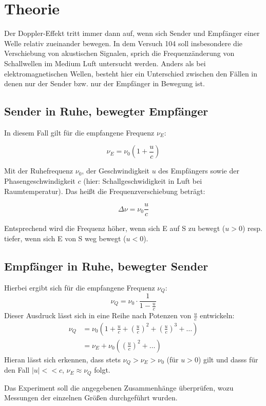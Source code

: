 \section{Theorie}
Der Doppler-Effekt tritt immer dann auf, wenn sich Sender und Empfänger einer Welle relativ zueinander bewegen. In dem Versuch 104
soll insbesondere die Verschiebung von akustischen Signalen, sprich die Frequenzänderung von Schallwellen im Medium Luft untersucht
werden. Anders als bei elektromagnetischen Wellen, besteht hier ein Unterschied zwischen den Fällen in denen nur der Sender bzw. nur
der Empfänger in Bewegung ist.

\subsection{Sender in Ruhe, bewegter Empfänger}
In diesem Fall gilt für die empfangene Frequenz $\nu_E$:

\begin{equation}
  \nu_E = \nu_0 (1 + \frac{u}{c})
\end{equation}

Mit der Ruhefrequenz $\nu_0$, der Geschwindigkeit $u$ des Empfängers sowie der Phasengeschwindigkeit $c$ (hier: Schallgeschwidigkeit in Luft bei Raumtemperatur).
Das heißt die Frequenzverschiebung beträgt:

\begin{equation}
  \Delta \nu = \nu_0 \frac{u}{c}
  \label{eq:frequenzverschiebung_bew_empf}
\end{equation}

Entsprechend wird die Frequenz höher, wenn sich E auf S zu bewegt ($u > 0$) resp. tiefer, wenn sich E von S weg bewegt ($u<0$).

\subsection{Empfänger in Ruhe, bewegter Sender}
Hierbei ergibt sich für die empfangene Frequenz $\nu_Q$:
\begin{equation}
  \nu_Q = \nu_0 \cdot \frac{1}{1 - \frac{u}{c}}
  \label{eq:frequenzveschiebung_bew_sen}
\end{equation}
Dieser Ausdruck lässt sich in eine Reihe nach Potenzen von $\frac{u}{c}$ entwickeln:
\begin{align}
  \nu_Q &= \nu_0 \left( 1 + \frac{u}{c} + \left( \frac{u}{c} \right)^2 +  \left( \frac{u}{c} \right)^3 + \dots \right) \\
       &= \nu_E + \nu_0 \left( \left( \frac{u}{c} \right)^2 + \dots \right)
\end{align}
Hieran lässt sich erkennen, dass stets $\nu_Q > \nu_E > \nu_0$ (für $u > 0$) gilt und dasss für den Fall $|u| << c$, $\nu_E \approx \nu_Q$ folgt.

Das Experiment soll die angegebenen Zusammenhänge überprüfen, wozu Messungen der einzelnen Größen durchgeführt wurden.
